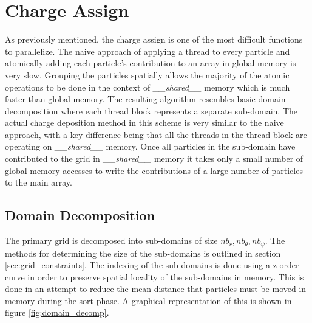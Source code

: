 	\section{Charge Assign}
	\label{sec:charge_assign}
	As previously mentioned, the charge assign is one of the most difficult functions to parallelize. The naive approach of applying a thread to every particle and atomically adding each particle's contribution to an array in global memory is very slow. Grouping the particles spatially allows the majority of the atomic operations to be done in the context of \emph{\_\_shared\_\_} memory which is much faster than global memory. The resulting algorithm resembles basic domain decomposition where each thread block represents a separate sub-domain. The actual charge deposition method in this scheme is very similar to the naive approach, with a key difference being that all the threads in the thread block are operating on \emph{\_\_shared\_\_} memory. Once all particles in the sub-domain have contributed to the grid in \emph{\_\_shared\_\_} memory it takes only a small number of global memory accesses to write the contributions of a large number of particles to the main array. 

	\subsection{Domain Decomposition}
		The primary grid is decomposed into sub-domains of size $nb_r, nb_{\theta}, nb_{\psi}$. The methods for determining the size of the sub-domains is outlined in section \ref{sec:grid_constraints}. The indexing of the sub-domains is done using a z-order curve in order to preserve spatial locality of the sub-domains in memory. This is done in an attempt to reduce the mean distance that particles must be moved in memory during the sort phase. A graphical representation of this is shown in figure \ref{fig:domain_decomp}.

